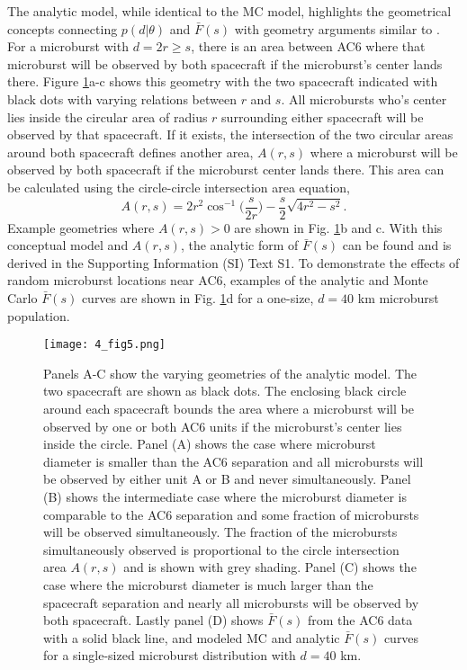 The analytic model, while identical to the MC model, highlights the geometrical concepts connecting $p(d | \theta)$ and $\bar{F}(s)$ with geometry arguments similar to \citet{Trefall1966}. For a microburst with $d = 2r \geq s$, there is an area between AC6 where that microburst will be observed by both spacecraft if the microburst's center lands there. Figure \ref{fig5}a-c shows this geometry with the two spacecraft indicated with black dots with varying relations between $r$ and $s$. All microbursts who's center lies inside the circular area of radius $r$ surrounding either spacecraft will be observed by that spacecraft. If it exists, the intersection of the two circular areas around both spacecraft defines another area, $A(r, s)$ where a microburst will be observed by both spacecraft if the microburst center lands there. This area can be calculated using the circle-circle intersection area equation, 
\begin{equation}
A(r, s) = 2r^2 \cos^{-1}{\Big( \frac{s}{2r} \Big)} - \frac{s}{2} \sqrt{4r^2 - s^2}.
\end{equation} Example geometries where $A(r, s) > 0$ are shown in Fig. \ref{fig5}b and c. With this conceptual model and $A(r, s)$, the analytic form of $\bar{F}(s)$ can be found and is derived in the Supporting Information (SI) Text S1. To demonstrate the effects of random microburst locations near AC6, examples of the analytic and Monte Carlo $\bar{F}(s)$ curves are shown in Fig. \ref{fig5}d for a one-size, $d=40$ km microburst population.

\begin{figure}
\centering
\texttt{[image: 4\_fig5.png]}
\caption{Panels A-C show the varying geometries of the analytic model. The two spacecraft are shown as black dots. The enclosing black circle around each spacecraft bounds the area where a microburst will be observed by one or both AC6 units if the microburst's center lies inside the circle. Panel (A) shows the case where microburst diameter is smaller than the AC6 separation and all microbursts will be observed by either unit A or B and never simultaneously. Panel (B) shows the intermediate case where the microburst diameter is comparable to the AC6 separation and some fraction of microbursts will be observed simultaneously. The fraction of the microbursts simultaneously observed is proportional to the circle intersection area $A(r, s)$ and is shown with grey shading. Panel (C) shows the case where the microburst diameter is much larger than the spacecraft separation and nearly all microbursts will be observed by both spacecraft. Lastly panel (D) shows $\bar{F}(s)$ from the AC6 data with a solid black line, and modeled MC and analytic $\bar{F}(s)$ curves for a single-sized microburst distribution with $d = 40$ km.} 
\label{fig5}
\end{figure}

